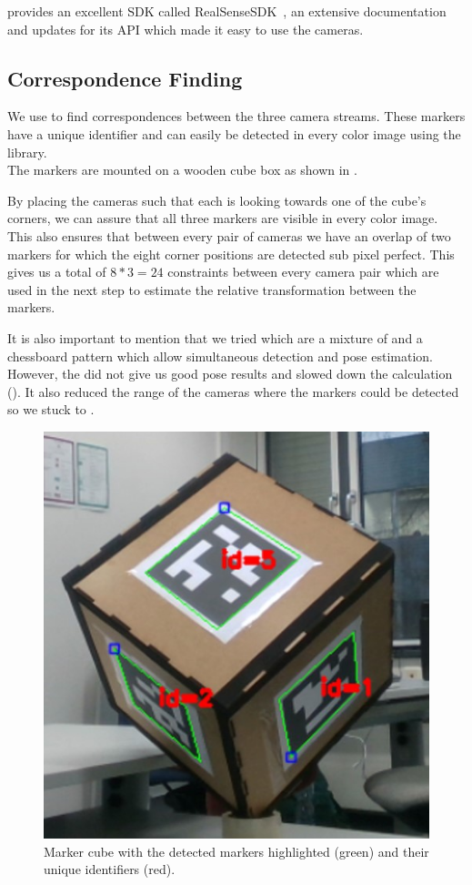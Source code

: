 \documentclass[10pt,twocolumn,letterpaper]{article}
\begin{document}
\intel{} provides an excellent SDK called RealSenseSDK~\cite{RealSenseSDK}, an extensive documentation and updates for its API which made it easy to use the cameras.

\subsection{Correspondence Finding}
We use \aruco{} to find correspondences between the three camera streams. These markers have a unique identifier and can easily be detected in every color image using the \opencv{} library.\\
The markers are mounted on a wooden cube box as shown in .

By placing the cameras such that each is looking towards one of the cube's corners, we can assure that all three markers are visible in every color image. This also ensures that between every pair of cameras we have an overlap of two markers for which the eight corner positions are detected sub pixel perfect. This gives us a total of $8*3=24$ constraints between every camera pair which are used in the next step to estimate the relative transformation between the markers.

It is also important to mention that we tried \charuco{} which are a mixture of \aruco{} and a chessboard pattern which allow simultaneous detection and pose estimation. However, the \charuco{} did not give us good pose results and slowed down the calculation (). It also reduced the range of the cameras where the markers could be detected so we stuck to \aruco{}. 
%
%
\begin{figure}[t]
	\begin{center}
		\includegraphics[width=0.6\linewidth]{imgs/cube}
	\end{center}
	\caption{Marker cube with the detected markers highlighted (green) and their unique identifiers (red).}
	\label{fig:cube}
\end{figure}
%
%
\end{document}
